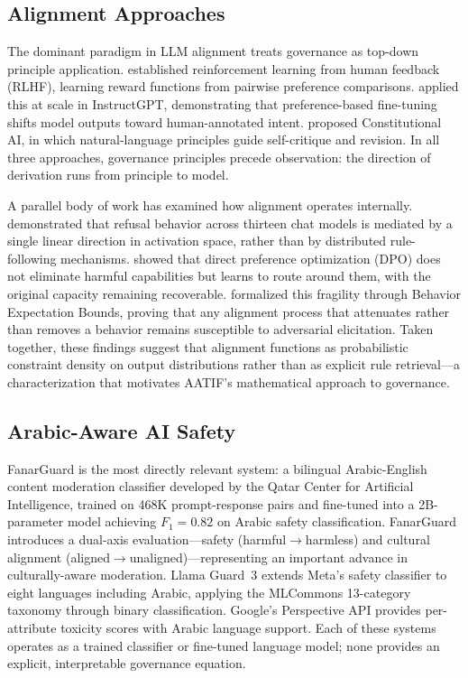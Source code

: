 \documentclass[11pt,a4paper]{article}
\begin{document}
\subsection{Alignment Approaches}

The dominant paradigm in LLM alignment treats governance as top-down principle application. \citet{christiano2017} established reinforcement learning from human feedback (RLHF), learning reward functions from pairwise preference comparisons. \citet{ouyang2022} applied this at scale in InstructGPT, demonstrating that preference-based fine-tuning shifts model outputs toward human-annotated intent. \citet{bai2022} proposed Constitutional AI, in which natural-language principles guide self-critique and revision. In all three approaches, governance principles precede observation: the direction of derivation runs from principle to model.

A parallel body of work has examined how alignment operates internally. \citet{arditi2024} demonstrated that refusal behavior across thirteen chat models is mediated by a single linear direction in activation space, rather than by distributed rule-following mechanisms. \citet{lee2024} showed that direct preference optimization (DPO) does not eliminate harmful capabilities but learns to route around them, with the original capacity remaining recoverable. \citet{wolf2024} formalized this fragility through Behavior Expectation Bounds, proving that any alignment process that attenuates rather than removes a behavior remains susceptible to adversarial elicitation. Taken together, these findings suggest that alignment functions as probabilistic constraint density on output distributions rather than as explicit rule retrieval---a characterization that motivates AATIF's mathematical approach to governance.

\subsection{Arabic-Aware AI Safety}

FanarGuard \citep{fanarguard2025} is the most directly relevant system: a bilingual Arabic-English content moderation classifier developed by the Qatar Center for Artificial Intelligence, trained on 468K prompt-response pairs and fine-tuned into a 2B-parameter model achieving $F_1 = 0.82$ on Arabic safety classification. FanarGuard introduces a dual-axis evaluation---safety (harmful$\to$harmless) and cultural alignment (aligned$\to$unaligned)---representing an important advance in culturally-aware moderation. Llama Guard~3 \citep{llamaguard2024} extends Meta's safety classifier to eight languages including Arabic, applying the MLCommons 13-category taxonomy through binary classification. Google's Perspective API \citep{perspective2017} provides per-attribute toxicity scores with Arabic language support. Each of these systems operates as a trained classifier or fine-tuned language model; none provides an explicit, interpretable governance equation.
\end{document}
